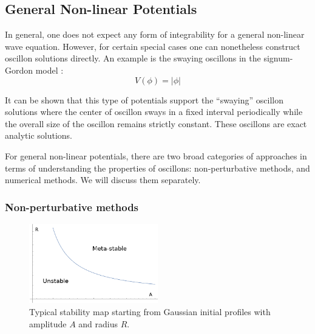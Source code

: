 \documentclass{report}
\begin{document}
\subsection{General Non-linear Potentials}
In general, one does not expect any form of integrability for a general non-linear wave equation. However, for certain special cases one can nonetheless construct oscillon solutions directly. An example is the swaying oscillons in the signum-Gordon model \cite{Arodz:2011zm}:
\begin{equation}
  V(\phi)=\left|\phi\right|
\end{equation}

It can be shown \cite{Arodz:2011zm} that this type of potentials support the ``swaying'' oscillon solutions where the center of oscillon sways in a fixed interval periodically while the overall size of the oscillon remains strictly constant. These oscillons are exact analytic solutions.

\medbreak

For general non-linear potentials, there are two broad categories of approaches in terms of understanding the properties of oscillons: non-perturbative methods, and numerical methods. We will discuss them separately.

\subsubsection{Non-perturbative methods}\label{nonpert}
\begin{figure}\centering
  \includegraphics[width=0.5\textwidth]{plot/stability.png}
  \caption{Typical stability map starting from Gaussian initial profiles with amplitude $A$ and radius $R$.}
  \label{stability}
\end{figure}
\end{document}
